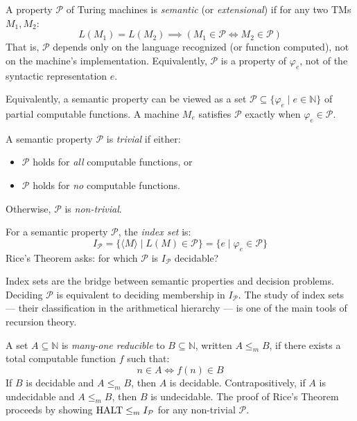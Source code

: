 \begin{definition}
A property $\mathcal{P}$ of Turing machines is \emph{semantic} (or \emph{extensional}) if for any two TMs $M_1, M_2$:
\[
L(M_1) = L(M_2) \implies (M_1 \in \mathcal{P} \iff M_2 \in \mathcal{P})
\]
That is, $\mathcal{P}$ depends only on the language recognized (or function computed), not on the machine's implementation. Equivalently, $\mathcal{P}$ is a property of $\varphi_e$, not of the syntactic representation $e$.
\end{definition}

Equivalently, a semantic property can be viewed as a set $\mathcal{P} \subseteq \{ \varphi_e \mid e \in \mathbb{N} \}$ of partial computable functions. A machine $M_e$ satisfies $\mathcal{P}$ exactly when $\varphi_e \in \mathcal{P}$.

\begin{definition}
A semantic property $\mathcal{P}$ is \emph{trivial} if either:
\begin{itemize}
\item $\mathcal{P}$ holds for \emph{all} computable functions, or
\item $\mathcal{P}$ holds for \emph{no} computable functions.
\end{itemize}
Otherwise, $\mathcal{P}$ is \emph{non-trivial}.
\end{definition}

\begin{definition}
For a semantic property $\mathcal{P}$, the \emph{index set} is:
\[
I_\mathcal{P} = \{ \langle M \rangle \mid L(M) \in \mathcal{P} \} = \{ e \mid \varphi_e \in \mathcal{P} \}
\]
Rice's Theorem asks: for which $\mathcal{P}$ is $I_\mathcal{P}$ decidable?
\end{definition}

Index sets are the bridge between semantic properties and decision problems. Deciding $\mathcal{P}$ is equivalent to deciding membership in $I_\mathcal{P}$. The study of index sets --- their classification in the arithmetical hierarchy --- is one of the main tools of recursion theory.

\begin{definition}
A set $A \subseteq \mathbb{N}$ is \emph{many-one reducible} to $B \subseteq \mathbb{N}$, written $A \leq_m B$, if there exists a total computable function $f$ such that:
\[
n \in A \iff f(n) \in B
\]
If $B$ is decidable and $A \leq_m B$, then $A$ is decidable. Contrapositively, if $A$ is undecidable and $A \leq_m B$, then $B$ is undecidable. The proof of Rice's Theorem proceeds by showing $\text{HALT} \leq_m I_\mathcal{P}$ for any non-trivial $\mathcal{P}$.
\end{definition}

